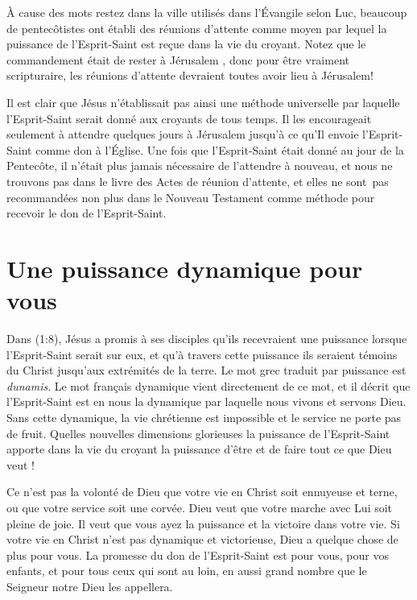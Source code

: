 À cause des mots \og restez dans la ville \fg{} utilisés dans
 l'Évangile
 selon Luc, beaucoup de pentecôtistes ont établi des \og réunions
 d'attente \fg{} comme moyen par lequel la puissance de l'Esprit-Saint est
 reçue dans la vie du croyant. Notez que le commandement était de \og rester
 à Jérusalem \fg{} ,
 donc pour être vraiment scripturaire, les réunions d'attente devraient toutes
 avoir lieu à Jérusalem!

Il est clair que Jésus n'établissait pas ainsi une méthode universelle par
 laquelle l'Esprit-Saint serait donné aux croyants de tous temps. Il les
 encourageait seulement à attendre quelques jours à Jérusalem jusqu'à ce
 qu'Il envoie l'Esprit-Saint comme don à l'Église. Une fois que
 l'Esprit-Saint était donné au jour de la Pentecôte, il n'était plus
 jamais nécessaire de l'attendre à nouveau, et nous ne trouvons pas dans
 le livre des Actes de réunion d'attente, et elles ne sont~pas recommandées
 non plus dans le Nouveau Testament comme méthode pour recevoir le don de
 l'Esprit-Saint.


\section{Une puissance dynamique pour vous}

Dans (1:8), Jésus a promis à ses disciples
 qu'ils recevraient une puissance lorsque l'Esprit-Saint serait
 sur eux, et qu'à travers cette puissance ils seraient témoins
 du Christ jusqu'aux extrémités de la terre.
 Le mot grec traduit par \og puissance \fg{} est \emph{dunamis}.
 Le mot français \og dynamique \fg{} vient directement de ce mot,
 et il décrit que l'Esprit-Saint est en nous \ocadr la dynamique par laquelle
 nous vivons et servons Dieu. Sans cette dynamique, la vie chrétienne est
 impossible et le service ne porte pas de fruit.
 Quelles nouvelles dimensions glorieuses la puissance de l'Esprit-Saint
 apporte dans la vie du croyant \ocadr la puissance d'être et de faire
 tout ce que Dieu veut !

Ce n'est pas la volonté de Dieu que votre vie en Christ soit ennuyeuse
 et terne, ou que votre service soit une corvée.
 Dieu veut que votre marche avec Lui soit pleine de joie.
 Il veut que vous ayez la puissance et la victoire dans votre vie.
 Si votre vie en Christ n'est pas dynamique et victorieuse,
 Dieu a quelque chose de plus pour vous.
 La promesse du don de l'Esprit-Saint est \og pour vous, pour vos enfants,
 et pour tous ceux qui sont au loin,
 en aussi grand nombre que le Seigneur notre Dieu les appellera. \fg{}
\closechapter

